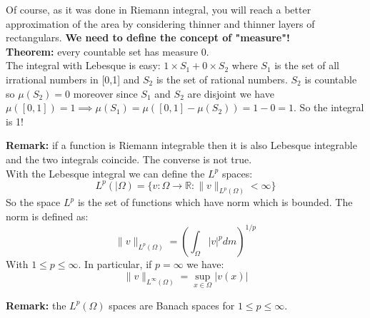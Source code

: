 Of course, as it was done in Riemann integral, you will reach a better approximation of the area by considering thinner and thinner layers of rectangulars.
\textbf{We need to define the concept of "measure"!}\\

\textbf{Theorem:} every countable set has measure 0.\\

The integral with Lebesque is easy: $1\times S_1 + 0\times S_2$ where $S_1$ is the set of all irrational numbers in [0,1] and $S_2$ is the set of rational numbers. $S_2$ is countable so $\mu(S_2) = 0$ moreover since $S_1$ and $S_2$ are disjoint we have $\mu([0,1]) = 1 \implies \mu(S_1) = \mu([0,1] - \mu(S_2)) = 1 - 0 = 1$. So the integral is 1!

\textbf{Remark:} if a function is Riemann integrable then it is also Lebesque integrable and the two integrals coincide. The converse is not true.\\

With the Lebesque integral we can define the $L^p$ spaces:  
\[
    L^p(|\Omega) = \{v: \Omega \to \mathbb{R}: \|v\|_{L^p(\Omega)} < \infty\}    
\]
So the space $L^p$ is the set of functions which have norm which is bounded. The norm is defined as:
\[
    \|v\|_{L^p(\Omega)} = \left(\int_{\Omega} |v|^p dm\right)^{1/p}
\]
With $1 \leq p \leq \infty$. In particular, if $p = \infty$ we have:
\[
    \|v\|_{L^\infty(\Omega)} = \sup_{x \in \Omega} |v(x)|    
\]

\textbf{Remark:} the $L^p(\Omega)$ spaces are Banach spaces for $1 \leq p \leq \infty$.\\

